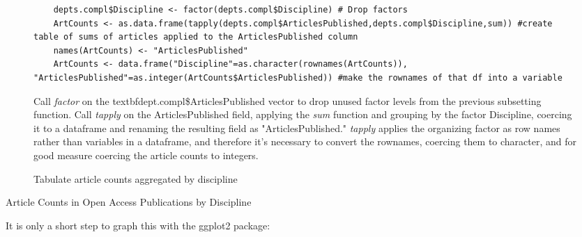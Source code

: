 \documentclass{article}
\begin{document}
\begin{figure}
	\centering
	\begin{lstlisting}
	depts.compl$Discipline <- factor(depts.compl$Discipline) # Drop factors
	ArtCounts <- as.data.frame(tapply(depts.compl$ArticlesPublished,depts.compl$Discipline,sum)) #create table of sums of articles applied to the ArticlesPublished column
	names(ArtCounts) <- "ArticlesPublished"
	ArtCounts <- data.frame("Discipline"=as.character(rownames(ArtCounts)), "ArticlesPublished"=as.integer(ArtCounts$ArticlesPublished)) #make the rownames of that df into a variable
	\end{lstlisting}
	\footnotesize{
	Call \textit{factor} on the textbf{dept.compl\$ArticlesPublished} vector to drop unused factor levels from the previous subsetting function.
	Call \textit{tapply} on the ArticlesPublished field, applying the \textit{sum} function and grouping by the factor Discipline, coercing it to a dataframe and renaming the resulting field as "ArticlesPublished."
	\textit{tapply} applies the organizing factor as row names rather than variables in a dataframe, and therefore it's necessary to convert the rownames, coercing them to character, and for good measure coercing the article counts to integers.
			}
	\caption{Tabulate article counts aggregated by discipline}
\end{figure}
\begin{table}
	\centering
	\caption{Article Counts in Open Access Publications by Discipline}
\end{table}
It is only a short step to graph this with the ggplot2 package:
\end{document}
